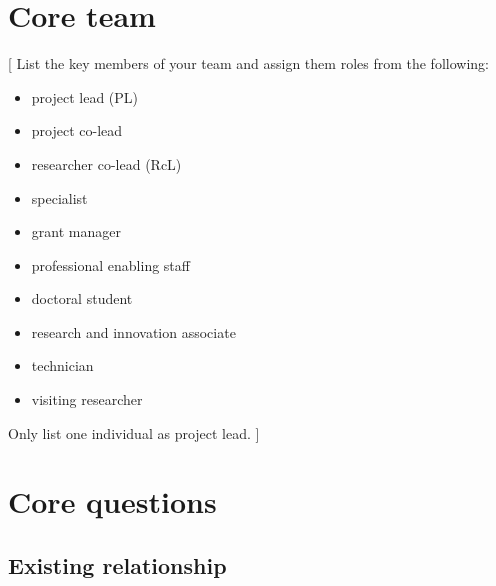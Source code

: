 \documentclass{article}
\newcommand{\desc}[1]{{\leavevmode\color{blue}[#1]}}
\begin{document}
\section{Core team}
\desc{
List the key members of your team and assign them roles from the following:

\begin{itemize}
    \item project lead (PL)

    \item project co-lead

    \item researcher co-lead (RcL)

    \item specialist

    \item grant manager

    \item professional enabling staff

    \item doctoral student

    \item research and innovation associate

    \item technician

    \item visiting researcher
\end{itemize}

Only list one individual as project lead.
}



\section{Core questions}

\subsection{Existing relationship}
\end{document}
